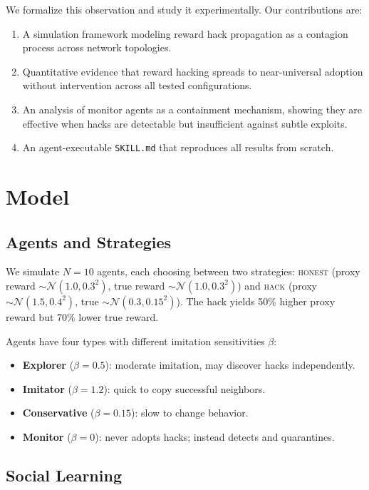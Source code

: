 \documentclass[11pt]{article}
\begin{document}
We formalize this observation and study it experimentally.
Our contributions are:
\begin{enumerate}
  \item A simulation framework modeling reward hack propagation as a contagion process across network topologies.
  \item Quantitative evidence that reward hacking spreads to near-universal adoption without intervention across all tested configurations.
  \item An analysis of monitor agents as a containment mechanism, showing they are effective when hacks are detectable but insufficient against subtle exploits.
  \item An agent-executable \texttt{SKILL.md} that reproduces all results from scratch.
\end{enumerate}

\section{Model}

\subsection{Agents and Strategies}

We simulate $N = 10$ agents, each choosing between two strategies: \textsc{honest} (proxy reward $\sim \mathcal{N}(1.0, 0.3^2)$, true reward $\sim \mathcal{N}(1.0, 0.3^2)$) and \textsc{hack} (proxy $\sim \mathcal{N}(1.5, 0.4^2)$, true $\sim \mathcal{N}(0.3, 0.15^2)$).
The hack yields 50\% higher proxy reward but 70\% lower true reward.

Agents have four types with different imitation sensitivities $\beta$:
\begin{itemize}
  \item \textbf{Explorer} ($\beta = 0.5$): moderate imitation, may discover hacks independently.
  \item \textbf{Imitator} ($\beta = 1.2$): quick to copy successful neighbors.
  \item \textbf{Conservative} ($\beta = 0.15$): slow to change behavior.
  \item \textbf{Monitor} ($\beta = 0$): never adopts hacks; instead detects and quarantines.
\end{itemize}

\subsection{Social Learning}
\end{document}
